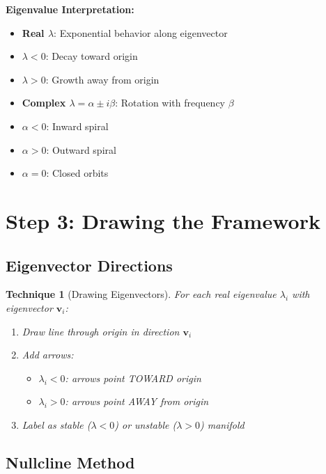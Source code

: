 \documentclass[12pt]{article}
\newtheorem{technique}{Technique}
\begin{document}
\begin{keypoint}
\textbf{Eigenvalue Interpretation:}
\begin{itemize}
    \item \textbf{Real $\lambda$}: Exponential behavior along eigenvector
    \item $\lambda < 0$: Decay toward origin
    \item $\lambda > 0$: Growth away from origin
    \item \textbf{Complex $\lambda = \alpha \pm i\beta$}: Rotation with frequency $\beta$
    \item $\alpha < 0$: Inward spiral
    \item $\alpha > 0$: Outward spiral
    \item $\alpha = 0$: Closed orbits
\end{itemize}
\end{keypoint}

\section{Step 3: Drawing the Framework}

\subsection{Eigenvector Directions}

\begin{technique}[Drawing Eigenvectors]
For each real eigenvalue $\lambda_{i}$ with eigenvector $\mathbf{v}_{i}$:
\begin{enumerate}
    \item Draw line through origin in direction $\mathbf{v}_{i}$
    \item Add arrows:
    \begin{itemize}
        \item $\lambda_{i} < 0$: arrows point TOWARD origin
        \item $\lambda_{i} > 0$: arrows point AWAY from origin
    \end{itemize}
    \item Label as stable ($\lambda < 0$) or unstable ($\lambda > 0$) manifold
\end{enumerate}
\end{technique}

\subsection{Nullcline Method}
\end{document}
